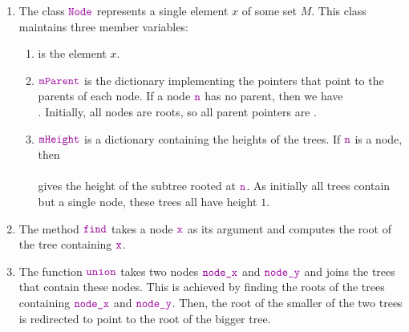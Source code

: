 \begin{enumerate}
\item The class $\mytt{Node}$ represents a single element $x$ of some set $M$.  This
      class maintains three member variables:
      \begin{enumerate}
      \item {} is the element $x$.
      \item $\mytt{mParent}$ is the dictionary implementing the pointers that point to the parents
             of each node.  If a node $\mytt{n}$ has no parent, then we have
             \\[0.2cm]
             \hspace*{1.3cm}
             .
             Initially, all nodes are roots, so all parent pointers are .
      \item $\mytt{mHeight}$ is a dictionary containing the heights of the trees.  If $\mytt{n}$ is
            a node, then
            \\[0.2cm]
            \hspace*{1.3cm}
            \\[0.2cm]
            gives the height of the subtree rooted at $\mytt{n}$. As initially all trees contain but
            a single node, these trees all have height $1$.
      \end{enumerate}
\item The method $\mytt{find}$ takes a node $\mytt{x}$ as its argument and computes the root of the
      tree containing $\mytt{x}$. 
\item The function $\mytt{union}$ takes two nodes $\mytt{node\_x}$ and $\mytt{node\_y}$ and joins the trees that
      contain these nodes.  This is achieved by finding the roots of the trees containing $\mytt{node\_x}$ and
      $\mytt{node\_y}$.
      Then, the root of the smaller of the two trees is redirected to point to
      the root of the bigger tree.
\end{enumerate}


